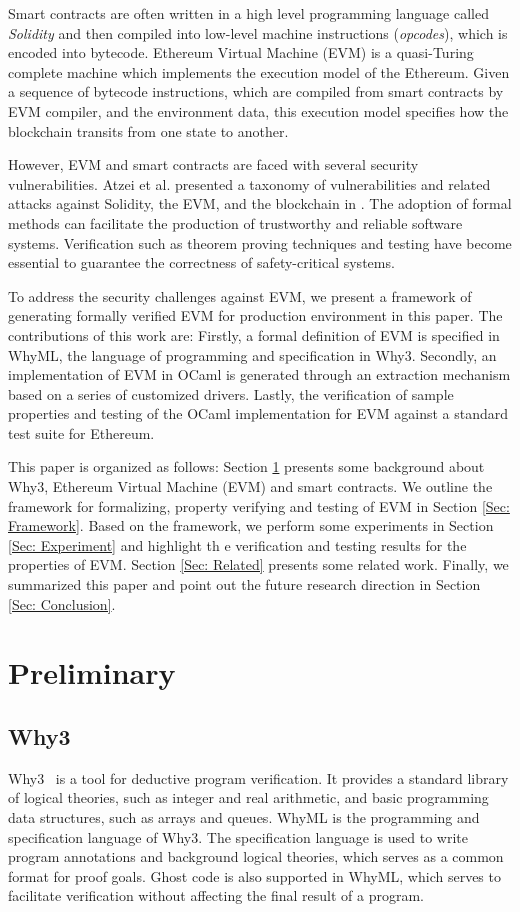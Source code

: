 \documentclass[runningheads]{llncs}
\begin{document}
Smart contracts are often written in a high level programming language called \textit{Solidity} \cite{solidity} and then compiled into low-level machine instructions (\textit{opcodes}), which is encoded into bytecode. Ethereum Virtual Machine (EVM) is a quasi-Turing complete machine which implements the execution model of the Ethereum. Given a sequence of bytecode instructions, which are compiled from smart contracts by EVM compiler, and the environment data, this execution model specifies how the blockchain transits from one state to another. 

However, EVM and smart contracts are faced with several security vulnerabilities. Atzei et al. presented a taxonomy of vulnerabilities and related attacks against Solidity, the EVM, and the blockchain in \cite{atzei2016survey}. The adoption of formal methods can facilitate the production of trustworthy and reliable software systems. Verification such as theorem proving techniques and testing have become essential to guarantee the correctness of safety-critical systems. 

To address the security challenges against EVM, we present a framework of generating formally verified EVM for production environment in this paper. The contributions of this work are: Firstly, a formal definition of EVM is specified in WhyML, the language of programming and specification in Why3. Secondly, an implementation of EVM in OCaml is generated through an extraction mechanism based on a series of customized drivers. Lastly, the verification of sample properties and testing of the OCaml implementation for EVM against a standard test suite for Ethereum.

This paper is organized as follows: Section \ref{Sec: Pre} presents some background about Why3, Ethereum Virtual Machine (EVM) and smart contracts. We outline the framework for formalizing, property verifying and testing of EVM in Section \ref{Sec: Framework}. Based on the framework, we perform some experiments in Section \ref{Sec: Experiment} and highlight th e verification and testing results for the properties of EVM. Section \ref{Sec: Related} presents some related work. Finally, we summarized this paper and point out the future research direction in Section \ref{Sec: Conclusion}.


\section{Preliminary}\label{Sec: Pre}
\subsection{Why3}
Why3~\cite{filliatre2013why3} is a tool for deductive program verification. It provides a standard library of logical theories, such as integer and real arithmetic, and basic programming data structures, such as arrays and queues. WhyML is the programming and specification language of Why3. The specification language is used to write program annotations and background logical theories, which serves as a common format for proof goals. Ghost code is also supported in WhyML, which serves to facilitate verification without affecting the final result of a program.
\end{document}
